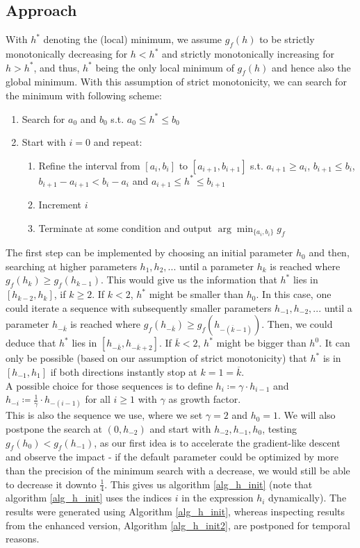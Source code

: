 \subsection{Approach}
With $h^*$ denoting the (local) minimum, we assume $g_f(h)$ to be strictly monotonically decreasing for $h<h^*$ and strictly monotonically increasing for $h>h^*$, and thus, $h^*$ being the only local minimum of $g_f(h)$ and hence also the global minimum. With this assumption of strict monotonicity, we can search for the minimum with following scheme:
\begin{enumerate}
\item Search for $a_0$ and $b_0$ s.t. $a_0\leq h^*\leq b_0$
\item Start with $i=0$ and repeat:
\begin{enumerate}
\item Refine the interval from $[a_i,b_i]$ to $[a_{i+1},b_{i+1}]$ s.t. $a_{i+1}\geq a_i$, $b_{i+1}\leq b_i$, $b_{i+1}-a_{i+1}<b_i-a_i$ and $a_{i+1}\leq h^*\leq b_{i+1}$
\item Increment $i$
\item Terminate at some condition and output $\arg \min_{\{a_i,b_i\}}g_f$
\end{enumerate}
\end{enumerate}
The first step can be implemented by choosing an initial parameter $h_0$ and then, searching at higher parameters $h_1,h_2,...$ until a parameter $h_k$ is reached where $g_f(h_k)\geq g_f(h_{k-1})$. This would give us the information that $h^*$ lies in $[h_{k-2},h_k]$, if $k\geq 2$. If $k<2$, $h^*$ might be smaller than $h_0$. In this case, one could iterate a sequence with subsequently smaller parameters $h_{-1},h_{-2},...$ until a parameter $h_{-\overline{k}}$ is reached where $g_f(h_{-\overline{k}})\geq g_f(h_{-(\overline{k}-1)})$. Then, we could deduce that $h^*$ lies in $[h_{-\overline{k}},h_{-\overline{k}+2}]$. If $\overline{k}<2$, $h^*$ might be bigger than $h^0$. It can only be possible (based on our assumption of strict monotonicity) that $h^*$ is in $[h_{-1},h_1]$ if both directions instantly stop at $k=1=\overline{k}$.\\
A possible choice for those sequences is to define $h_{i}\coloneqq \gamma\cdot h_{i-1}$ and $h_{-i}\coloneqq \frac{1}{\gamma}\cdot h_{-(i-1)}$ for all $i\geq 1$ with $\gamma$ as growth factor.\\
This is also the sequence we use, where we set $\gamma=2$ and $h_0=1$. We will also postpone the search at $(0,h_{-2})$ and start with $h_{-2},h_{-1},h_0$, testing $g_f(h_0)<g_f(h_{-1})$, as our first idea is to accelerate the gradient-like descent and observe the impact - if the default parameter could be optimized by more than the precision of the minimum search with a decrease, we would still be able to decrease it downto $\frac{1}{4}$. This gives us algorithm \ref{alg_h_init} (note that algorithm \ref{alg_h_init} uses the indices $i$ in the expression $h_i$ dynamically). The results were generated using Algorithm \ref{alg_h_init}, whereas inspecting results from the enhanced version, Algorithm \ref{alg_h_init2}, are postponed for temporal reasons.
